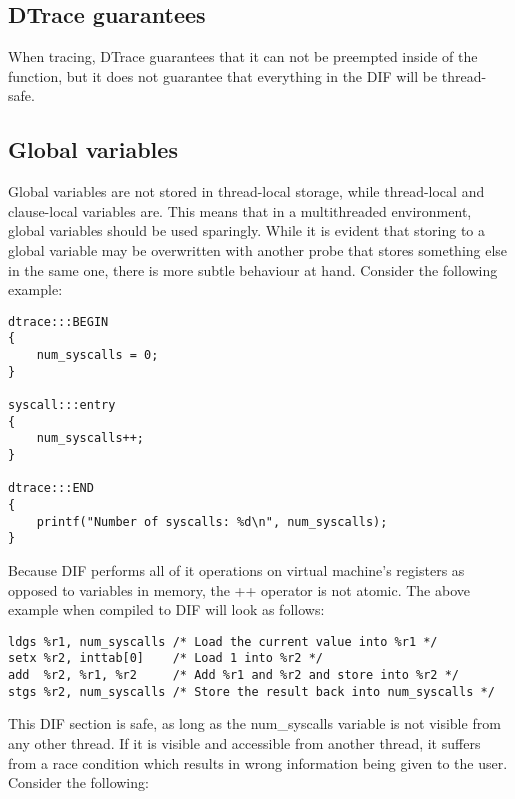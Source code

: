 \subsection{DTrace guarantees}


When tracing, DTrace guarantees that it can not be preempted inside of the
 function, but it does not guarantee that everything in
the DIF will be thread-safe.

\subsection{Global variables}

Global variables are not stored in thread-local storage,
while thread-local and clause-local variables are. This means that in a
multithreaded environment, global variables should be used sparingly. While it
is evident that storing to a global variable may be overwritten with another
probe that stores something else in the same one, there is more subtle behaviour
at hand. Consider the following example:

\begin{verbatim}
dtrace:::BEGIN
{
    num_syscalls = 0;
}

syscall:::entry
{
    num_syscalls++;
}

dtrace:::END
{
    printf("Number of syscalls: %d\n", num_syscalls);
}
\end{verbatim}

\noindent
Because DIF performs all of it operations on virtual machine's registers as opposed
to variables in memory, the ++ operator is not atomic. The above example when compiled
to DIF will look as follows:

\begin{verbatim}
ldgs %r1, num_syscalls /* Load the current value into %r1 */
setx %r2, inttab[0]    /* Load 1 into %r2 */
add  %r2, %r1, %r2     /* Add %r1 and %r2 and store into %r2 */
stgs %r2, num_syscalls /* Store the result back into num_syscalls */
\end{verbatim}

\noindent
This DIF section is safe, as long as the num\_syscalls variable is not visible from any
other thread. If it is visible and accessible from another thread, it suffers from a race
condition which results in wrong information being given to the user. Consider the following:

